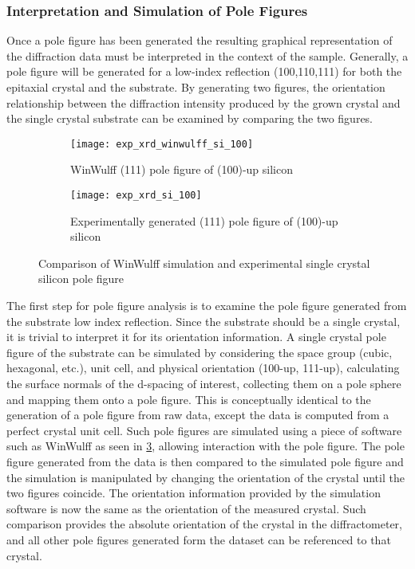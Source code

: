 \subsubsection{Interpretation and Simulation of Pole Figures}
Once a pole figure has been generated the resulting graphical representation of the diffraction data must be interpreted in the context of the sample. Generally, a pole figure will be generated for a low-index reflection (100,110,111) for both the epitaxial crystal and the substrate. By generating two figures, the orientation relationship between the diffraction intensity produced by the grown crystal and the single crystal substrate can be examined by comparing the two figures.
\begin{figure}
    \centering
    \centering
    \begin{subfigure}[t]{0.55\textwidth}
        \centering
        \texttt{[image: exp\_xrd\_winwulff\_si\_100]}
        \caption{\label{fig:exp_xrd_winwulff_si_100}WinWulff (111) pole figure of (100)-up silicon}
    \end{subfigure}%
    \begin{subfigure}[t]{0.45\textwidth}
        \centering
        \texttt{[image: exp\_xrd\_si\_100]}
        \caption{\label{fig:exp_xrd_si_100}Experimentally generated (111) pole figure of (100)-up silicon}
    \end{subfigure}
    \caption{\label{fig:exp_xray_winwulff}Comparison of WinWulff simulation and experimental single crystal silicon pole figure}
\end{figure}

The first step for pole figure analysis is to examine the pole figure generated from the substrate low index reflection. Since the substrate should be a single crystal, it is trivial to interpret it for its orientation information. A single crystal pole figure of the substrate can be simulated by considering the space group (cubic, hexagonal, etc.), unit cell, and physical orientation (100-up, 111-up), calculating the surface normals of the d-spacing of interest, collecting them on a pole sphere and mapping them onto a pole figure. This is conceptually identical to the generation of a pole figure from raw data, except the data is computed from a perfect crystal unit cell. Such pole figures are simulated using a piece of software such as WinWulff\cite{Weber2006} as seen in \cref{fig:exp_xray_winwulff}, allowing interaction with the pole figure.  The pole figure generated from the data is then compared to the simulated pole figure and the simulation is manipulated by changing the orientation of the crystal until the two figures coincide. The orientation information provided by the simulation software is now the same as the orientation of the measured crystal. Such comparison provides the absolute orientation of the crystal in the diffractometer, and all other pole figures generated form the dataset can be referenced to that crystal.

